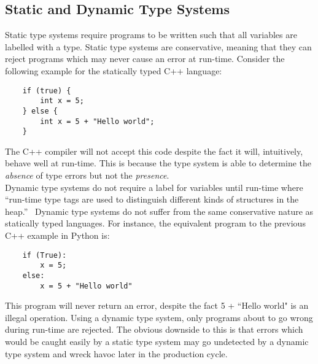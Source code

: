 \documentclass[12pt, titlepage]{article}
\begin{document}
\subsection{Static and Dynamic Type Systems}
Static type systems require programs to be written such that all variables are labelled with a type. Static type systems are conservative, meaning that they can reject programs which may never cause an error at run-time. Consider the following example for the statically typed C++ language:
\begin{lstlisting}
	if (true) {	
		int x = 5;
	} else {
		int x = 5 + "Hello world";
	}
\end{lstlisting}
The C++ compiler will not accept this code despite the fact it will, intuitively, behave well at run-time. This is because the type system is able to determine the \textit{absence} of type errors but not the \textit{presence}. \\
Dynamic type systems do not require a label for variables until run-time where ``run-time type tags are used to distinguish different kinds of structures in the heap.''~\cite{pierce02} Dynamic type systems do not suffer from the same conservative nature as statically typed languages. For instance, the equivalent program to the previous C++ example in Python is:
\begin{lstlisting}
	if (True):	
		x = 5;
	else:
		x = 5 + "Hello world"
\end{lstlisting}
This program will never return an error, despite the fact 5 + ``Hello  world" is an illegal operation. Using a dynamic type system, only programs about to go wrong during run-time are rejected. The obvious downside to this is that errors which would be caught easily by a static type system may go undetected by a dynamic type system and wreck havoc later in the production cycle.
\end{document}
